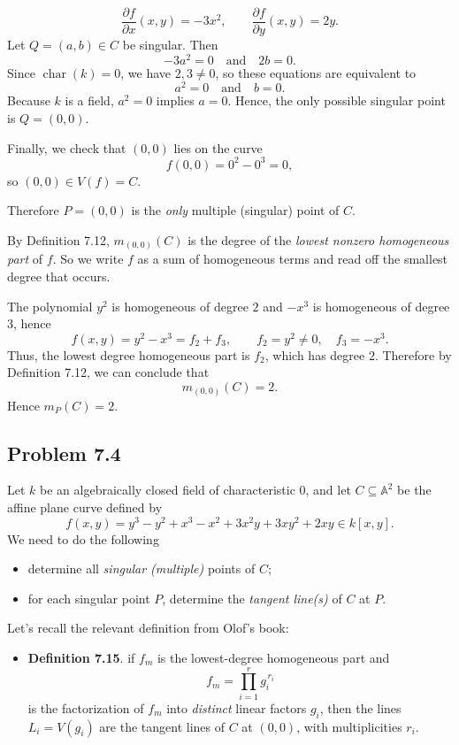 \documentclass[a4paper,12pt,openany]{article}
\theoremstyle{plain}
\theoremstyle{definition}
\theoremstyle{remark}
\begin{document}
\[
\frac{\partial f}{\partial x}(x,y)=-3x^{2},
\qquad
\frac{\partial f}{\partial y}(x,y)=2y.
\]
Let $Q=(a,b)\in C$ be singular. Then
\[
-3a^{2}=0
\quad\text{and}\quad
2b=0.
\]
Since $\operatorname{char}(k)=0$, we have $2,3\neq 0$, so these equations are equivalent to
\[
a^{2}=0
\quad\text{and}\quad
b=0.
\]
Because $k$ is a field, $a^{2}=0$ implies $a=0$. Hence, the only possible singular point is $Q=(0,0)$.

Finally, we check that $(0,0)$ lies on the curve
\[
f(0,0)=0^{2}-0^{3}=0,
\]
so $(0,0)\in V(f)=C$.

Therefore $P=(0,0)$ is the \emph{only} multiple (singular) point of $C$.

\medskip

By Definition 7.12, $m_{(0,0)}(C)$ is the degree of the \emph{lowest nonzero homogeneous part} of $f$.
So we write $f$ as a sum of homogeneous terms and read off the smallest degree that occurs.

The polynomial $y^{2}$ is homogeneous of degree $2$ and $-x^{3}$ is homogeneous of degree $3$, hence
\[
f(x,y)=y^{2}-x^{3}= f_{2}+f_{3},
\qquad
f_{2}=y^{2}\neq 0,\quad f_{3}=-x^{3}.
\]
Thus, the lowest degree homogeneous part is $f_{2}$, which has degree $2$. Therefore by Definition 7.12, we can conclude that
\[
m_{(0,0)}(C)=2.
\]
Hence $m_{P}(C)=2$.


\subsection*{Problem 7.4}
Let $k$ be an algebraically closed field of characteristic $0$, and let
$C\subseteq \mathbb{A}^2$ be the affine plane curve defined by
\[
f(x,y)=y^{3}-y^{2}+x^{3}-x^{2}+3x^{2}y+3xy^{2}+2xy
\in k[x,y].
\]
We need to do the following
\begin{itemize}
\item[a)] determine all \emph{singular (multiple)} points of $C$;
\item[b)] for each singular point $P$, determine the \emph{tangent line(s)} of $C$ at $P$.
\end{itemize}

\medskip

Let's recall the relevant definition from Olof's book:
\begin{itemize}
    \item \textbf{Definition 7.15}.  if $f_m$ is the lowest-degree homogeneous part and
    \[
    f_m=\prod_{i=1}^r g_i^{\,r_i}
    \]
    is the factorization of $f_m$ into \emph{distinct} linear factors $g_i$, then the lines $L_i=V(g_i)$ are the tangent lines
    of $C$ at $(0,0)$, with multiplicities $r_i$.
\end{itemize}
\end{document}
